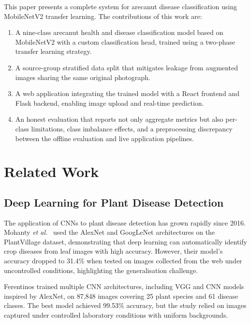 \documentclass[conference]{IEEEtran}
\begin{document}
This paper presents a complete system for arecanut disease classification using MobileNetV2 transfer learning. The contributions of this work are:
\begin{enumerate}
    \item A nine-class arecanut health and disease classification model based on MobileNetV2 with a custom classification head, trained using a two-phase transfer learning strategy.
    \item A source-group stratified data split that mitigates leakage from augmented images sharing the same original photograph.
    \item A web application integrating the trained model with a React frontend and Flask backend, enabling image upload and real-time prediction.
    \item An honest evaluation that reports not only aggregate metrics but also per-class limitations, class imbalance effects, and a preprocessing discrepancy between the offline evaluation and live application pipelines.
\end{enumerate}

\section{Related Work}
\label{sec:related}

\subsection{Deep Learning for Plant Disease Detection}

The application of CNNs to plant disease detection has grown rapidly since 2016. Mohanty \textit{et al.}~\cite{mohanty2016} used the AlexNet and GoogLeNet architectures on the PlantVillage dataset, demonstrating that deep learning can automatically identify crop diseases from leaf images with high accuracy. However, their model's accuracy dropped to 31.4\% when tested on images collected from the web under uncontrolled conditions, highlighting the generalisation challenge.

Ferentinos \cite{ferentinos2018} trained multiple CNN architectures, including VGG and CNN models inspired by AlexNet, on 87{,}848 images covering 25 plant species and 61 disease classes. The best model achieved 99.53\% accuracy, but the study relied on images captured under controlled laboratory conditions with uniform backgrounds.
\end{document}
